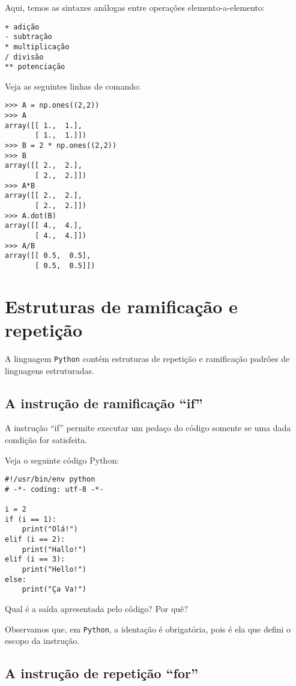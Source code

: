 Aqui, temos as sintaxes análogas entre operações elemento-a-elemento:
\begin{verbatim}
+ adição
- subtração
* multiplicação
/ divisão
** potenciação
\end{verbatim}

\begin{ex}
  Veja as seguintes linhas de comando:
\begin{verbatim}
>>> A = np.ones((2,2))
>>> A
array([[ 1.,  1.],
       [ 1.,  1.]])
>>> B = 2 * np.ones((2,2))
>>> B
array([[ 2.,  2.],
       [ 2.,  2.]])
>>> A*B
array([[ 2.,  2.],
       [ 2.,  2.]])
>>> A.dot(B)
array([[ 4.,  4.],
       [ 4.,  4.]])
>>> A/B
array([[ 0.5,  0.5],
       [ 0.5,  0.5]])
\end{verbatim}
\end{ex}

\section{Estruturas de ramificação e repetição}

A linguagem \verb+Python+ contém estruturas de repetição e ramificação padrões de linguagens estruturadas.

\subsection{A instrução de ramificação ``if''}

A instrução ``if'' permite executar um pedaço do código somente se uma dada condição for satisfeita.

\begin{ex}
  Veja o seguinte código Python:
\begin{verbatim}
#!/usr/bin/env python
# -*- coding: utf-8 -*-

i = 2
if (i == 1):
    print("Olá!")
elif (i == 2):
    print("Hallo!")
elif (i == 3):
    print("Hello!")
else:
    print("Ça Va!")
\end{verbatim}
Qual é a saída apresentada pelo código? Por quê?
\end{ex}

Observamos que, em \verb+Python+, a identação é obrigatória, pois é ela que defini o escopo da instrução.

\subsection{A instrução de repetição ``for''}

